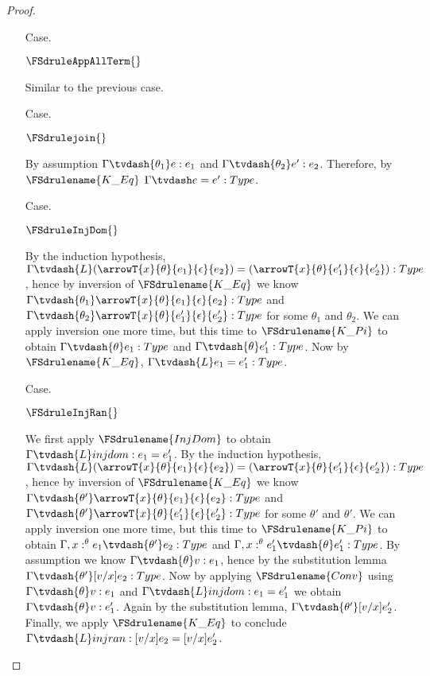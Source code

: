 \begin{proof}
\begin{itemize}
  \item[Case.] \ \\
    \begin{center}
      $\FSdruleAppAllTerm{}$ 
    \end{center}
    Similar to the previous case.

  \item[Case.] \ \\
    \begin{center}
      $\FSdrulejoin{}$
    \end{center}
    By assumption $\Gamma \tvdash{\theta_1} e:e_1$ and $\Gamma \tvdash{\theta_2} e':e_2$.  
    Therefore, by $\FSdrulename{K\_Eq}$ $\Gamma \tvdash e = e':Type$.

  \item[Case.] \ \\
    \begin{center}
      $\FSdruleInjDom{}$
    \end{center}
    By the induction hypothesis, 
    $\Gamma \tvdash{L} (\arrowT{x}{\theta}{e_1}{\epsilon}{e_2}) = 
    (\arrowT{x}{\theta}{e'_1}{\epsilon}{e'_2}):Type$, hence by inversion of 
    $\FSdrulename{K\_Eq}$ we know
    $\Gamma \tvdash{\theta_1} \arrowT{x}{\theta}{e_1}{\epsilon}{e_2}:Type$ and
    $\Gamma \tvdash{\theta_2} \arrowT{x}{\theta}{e'_1}{\epsilon}{e'_2}:Type$ for some $\theta_1$
    and $\theta_2$.  We can apply inversion one more time, but this time to 
    $\FSdrulename{K\_Pi}$ to obtain $\Gamma \tvdash{\theta} e_1:Type$ and 
    $\Gamma \tvdash{\theta} e'_1:Type$.  Now by 
    $\FSdrulename{K\_Eq}$, $\Gamma \tvdash{L} e_1 = e'_1:Type$.

  \item[Case.] \ \\
    \begin{center}
      $\FSdruleInjRan{}$
    \end{center}
    We first apply $\FSdrulename{InjDom}$ to obtain $\Gamma \tvdash{L} injdom:e_1 = e'_1$.
    By the induction hypothesis, 
    $\Gamma \tvdash{L} (\arrowT{x}{\theta}{e_1}{\epsilon}{e_2}) = 
    (\arrowT{x}{\theta}{e'_1}{\epsilon}{e'_2}):Type$, hence by inversion of 
    $\FSdrulename{K\_Eq}$ we know
    $\Gamma \tvdash{\theta'} \arrowT{x}{\theta}{e_1}{\epsilon}{e_2}:Type$ and
    $\Gamma \tvdash{\theta'} \arrowT{x}{\theta}{e'_1}{\epsilon}{e'_2}:Type$ for some $\theta'$
    and $\theta'$.  We can apply inversion one more time, but this time to 
    $\FSdrulename{K\_Pi}$ to obtain $\Gamma,x:^\theta e_1 \tvdash{\theta'} e_2:Type$ and 
    $\Gamma,x:^\theta e'_1 \tvdash{\theta} e'_1:Type$.  By assumption we know
    $\Gamma \tvdash{\theta} v:e_1$, hence by the substitution lemma 
    $\Gamma \tvdash{\theta'}[v/x]e_2:Type$.  Now by applying $\FSdrulename{Conv}$ using
    $\Gamma \tvdash{\theta} v:e_1$ and $\Gamma \tvdash{L} injdom:e_1 = e'_1$ we obtain
    $\Gamma \tvdash{\theta} v:e'_1$.  Again by the substitution lemma, 
    $\Gamma \tvdash{\theta'} [v/x]e'_2$.  Finally, we apply $\FSdrulename{K\_Eq}$ to conclude
    $\Gamma \tvdash{L} injran:[v/x]e_2 = [v/x]e'_2$.


\end{itemize}
\end{proof}

